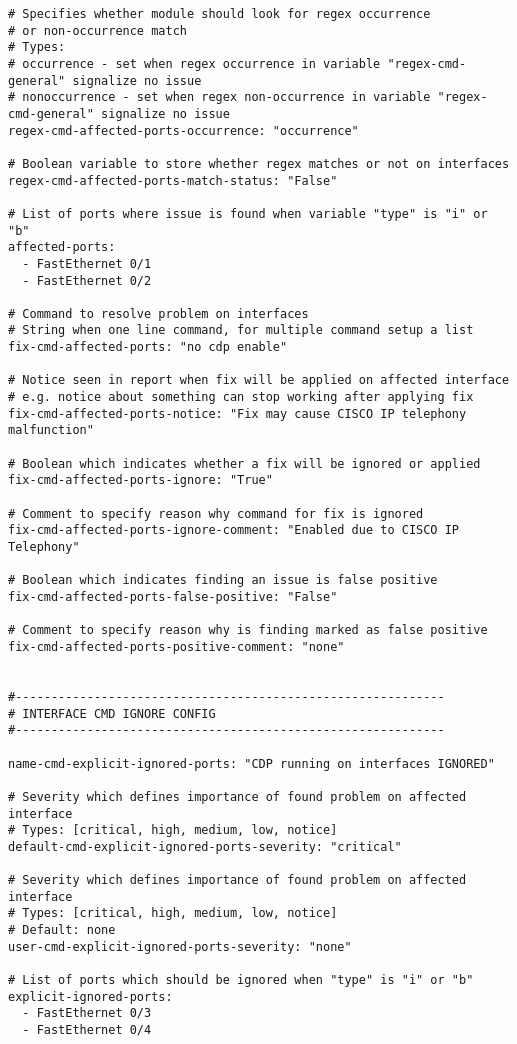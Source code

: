 \begin{lstlisting}
# Specifies whether module should look for regex occurrence
# or non-occurrence match
# Types:
# occurrence - set when regex occurrence in variable "regex-cmd-general" signalize no issue
# nonoccurrence - set when regex non-occurrence in variable "regex-cmd-general" signalize no issue
regex-cmd-affected-ports-occurrence: "occurrence"

# Boolean variable to store whether regex matches or not on interfaces 
regex-cmd-affected-ports-match-status: "False"

# List of ports where issue is found when variable "type" is "i" or "b"
affected-ports:
  - FastEthernet 0/1
  - FastEthernet 0/2

# Command to resolve problem on interfaces
# String when one line command, for multiple command setup a list
fix-cmd-affected-ports: "no cdp enable"

# Notice seen in report when fix will be applied on affected interface
# e.g. notice about something can stop working after applying fix
fix-cmd-affected-ports-notice: "Fix may cause CISCO IP telephony malfunction"

# Boolean which indicates whether a fix will be ignored or applied
fix-cmd-affected-ports-ignore: "True"

# Comment to specify reason why command for fix is ignored
fix-cmd-affected-ports-ignore-comment: "Enabled due to CISCO IP Telephony"

# Boolean which indicates finding an issue is false positive
fix-cmd-affected-ports-false-positive: "False"

# Comment to specify reason why is finding marked as false positive
fix-cmd-affected-ports-positive-comment: "none"


#------------------------------------------------------------
# INTERFACE CMD IGNORE CONFIG
#------------------------------------------------------------

name-cmd-explicit-ignored-ports: "CDP running on interfaces IGNORED"

# Severity which defines importance of found problem on affected interface
# Types: [critical, high, medium, low, notice]
default-cmd-explicit-ignored-ports-severity: "critical"

# Severity which defines importance of found problem on affected interface
# Types: [critical, high, medium, low, notice]
# Default: none
user-cmd-explicit-ignored-ports-severity: "none"

# List of ports which should be ignored when "type" is "i" or "b"
explicit-ignored-ports:
  - FastEthernet 0/3
  - FastEthernet 0/4


\end{lstlisting}
